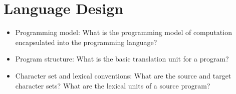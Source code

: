 \section{Language Design}
\label{sect:desg}

\begin{itemize}
\item Programming model: What is the programming model of
computation encapsulated into the programming language?
\item Program structure: What is the basic translation unit for a
program?
\item Character set and lexical conventions: What are the source
and target character sets? What are the lexical units of a source
program?
\end{itemize}
